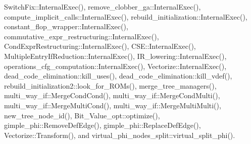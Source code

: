 Switch\+Fix\+::\+Internal\+Exec(), remove\+\_\+clobber\+\_\+ga\+::\+Internal\+Exec(), compute\+\_\+implicit\+\_\+calls\+::\+Internal\+Exec(), rebuild\+\_\+initialization\+::\+Internal\+Exec(), constant\+\_\+flop\+\_\+wrapper\+::\+Internal\+Exec(), commutative\+\_\+expr\+\_\+restructuring\+::\+Internal\+Exec(), Cond\+Expr\+Restructuring\+::\+Internal\+Exec(), C\+S\+E\+::\+Internal\+Exec(), Multiple\+Entry\+If\+Reduction\+::\+Internal\+Exec(), I\+R\+\_\+lowering\+::\+Internal\+Exec(), operations\+\_\+cfg\+\_\+computation\+::\+Internal\+Exec(), Vectorize\+::\+Internal\+Exec(), dead\+\_\+code\+\_\+elimination\+::kill\+\_\+uses(), dead\+\_\+code\+\_\+elimination\+::kill\+\_\+vdef(), rebuild\+\_\+initialization2\+::look\+\_\+for\+\_\+\+R\+O\+Ms(), merge\+\_\+tree\+\_\+managers(), multi\+\_\+way\+\_\+if\+::\+Merge\+Cond\+Cond(), multi\+\_\+way\+\_\+if\+::\+Merge\+Cond\+Multi(), multi\+\_\+way\+\_\+if\+::\+Merge\+Multi\+Cond(), multi\+\_\+way\+\_\+if\+::\+Merge\+Multi\+Multi(), new\+\_\+tree\+\_\+node\+\_\+id(), Bit\+\_\+\+Value\+\_\+opt\+::optimize(), gimple\+\_\+phi\+::\+Remove\+Def\+Edge(), gimple\+\_\+phi\+::\+Replace\+Def\+Edge(), Vectorize\+::\+Transform(), and virtual\+\_\+phi\+\_\+nodes\+\_\+split\+::virtual\+\_\+split\+\_\+phi().

